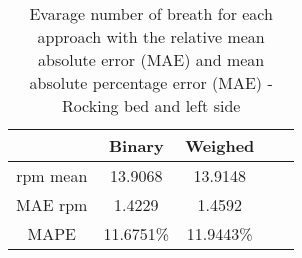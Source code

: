 
\begin{table}[h]

    \centering

\begin{tabular}{|c|c|c|c|c|}
\hline 
& Binary & Weighed \\ 
 
\hline 
rpm mean & 13.9068 &  13.9148  \\  
MAE rpm   &   1.4229&      1.4592 \\ 
MAPE   & 11.6751\% &  11.9443\% \\ 

\hline 
\end{tabular}
\caption{Evarage number of breath for each approach with the relative mean
absolute error (MAE) and mean absolute percentage error (MAE) - Rocking bed
and left side}
\label{tab:LeftRockingMetricssg}
\end{table}